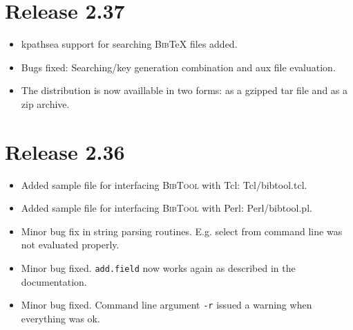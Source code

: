 \documentclass[11pt,a4paper]{scrartcl}
\newcommand\Arg[1]{\texttt{#1}}
\newcommand\rsc[1]{\texttt{#1}}
\newcommand\File[1]{\textsf{#1}}
\newcommand\BibTool{\textsc{BibTool}}
\newcommand\BibTeX{\textsc{Bib}\TeX}
\newenvironment{Release}[2]{\section*{Release #1}\begin{itemize}}{\end{itemize}}
\newenvironment{Fix}[1]{\item }{}
\newenvironment{New}[1]{\item }{}
\begin{document}
 \begin{Release}{2.37}{}
  \begin{New}{gene}
    kpathsea support for searching \BibTeX{} files added.
  \end{New}
  \begin{Fix}{gene}
    Bugs fixed: Searching/key generation combination and aux file evaluation.
  \end{Fix}
  \begin{New}{gene}
    The distribution is now availlable in two forms: as a gzipped tar file and
    as a zip archive.
  \end{New}
 \end{Release}

 \begin{Release}{2.36}{}
  \begin{New}{gene}
    Added sample file for interfacing \BibTool{} with Tcl:
    \File{Tcl/bibtool.tcl}.
  \end{New}
  \begin{New}{gene}
    Added sample file for interfacing \BibTool{} with Perl:
    \File{Perl/bibtool.pl}.
  \end{New}
  \begin{Fix}{gene}
    Minor bug fix in string parsing routines. E.g. select from command line
    was not evaluated properly.
  \end{Fix}
  \begin{Fix}{gene}
    Minor bug fixed. \rsc{add.field} now works again as described in
    the documentation.
  \end{Fix}
  \begin{Fix}{gene}
    Minor bug fixed. Command line argument \Arg{-r} issued a warning
    when everything was ok.
  \end{Fix}
 \end{Release}
\end{document}
